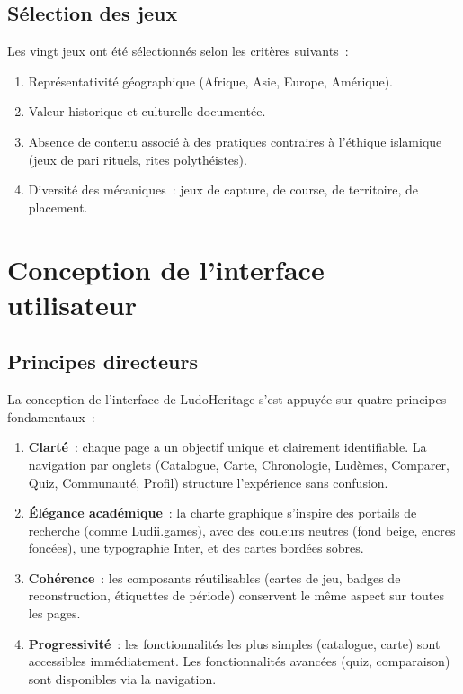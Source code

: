 \subsection{Sélection des jeux}

Les vingt jeux ont été sélectionnés selon les critères suivants~:
\begin{enumerate}
    \item Représentativité géographique (Afrique, Asie, Europe, Amérique).
    \item Valeur historique et culturelle documentée.
    \item Absence de contenu associé à des pratiques contraires à l'éthique islamique
          (jeux de pari rituels, rites polythéistes).
    \item Diversité des mécaniques~: jeux de capture, de course, de territoire, de placement.
\end{enumerate}

\section{Conception de l'interface utilisateur}

\subsection{Principes directeurs}

La conception de l'interface de LudoHeritage s'est appuyée sur quatre principes fondamentaux~:

\begin{enumerate}
    \item \textbf{Clarté}~: chaque page a un objectif unique et clairement identifiable.
          La navigation par onglets (Catalogue, Carte, Chronologie, Ludèmes, Comparer, Quiz,
          Communauté, Profil) structure l'expérience sans confusion.

    \item \textbf{Élégance académique}~: la charte graphique s'inspire des portails de recherche
          (comme Ludii.games), avec des couleurs neutres (fond beige, encres foncées), une
          typographie Inter, et des cartes bordées sobres.

    \item \textbf{Cohérence}~: les composants réutilisables (cartes de jeu, badges de
          reconstruction, étiquettes de période) conservent le même aspect sur toutes les pages.

    \item \textbf{Progressivité}~: les fonctionnalités les plus simples (catalogue, carte) sont
          accessibles immédiatement. Les fonctionnalités avancées (quiz, comparaison) sont
          disponibles via la navigation.
\end{enumerate}

